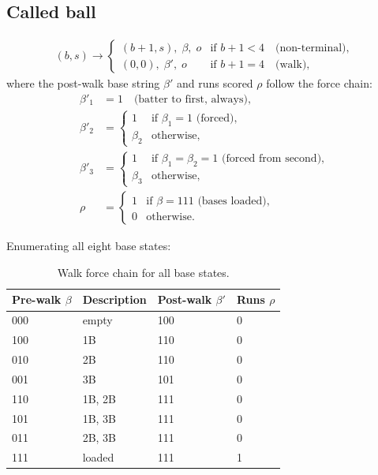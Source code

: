 \subsection{Called ball}
\begin{align}
(b, s) \to
\begin{cases}
(b+1, s), \; \beta, \; o & \text{if } b + 1 < 4 \quad \text{(non-terminal)},\\
(0,0), \; \beta', \; o & \text{if } b + 1 = 4 \quad \text{(walk)},
\end{cases}
\end{align}
where the post-walk base string $\beta'$ and runs scored $\rho$ follow the
force chain:
\begin{align}
\beta'_1 &= 1 \quad \text{(batter to first, always)},\\
\beta'_2 &= \begin{cases} 1 & \text{if } \beta_1 = 1 \text{ (forced)},\\
                          \beta_2 & \text{otherwise},\end{cases}\\
\beta'_3 &= \begin{cases} 1 & \text{if } \beta_1 = \beta_2 = 1
                              \text{ (forced from second)},\\
                          \beta_3 & \text{otherwise},\end{cases}\\
\rho &= \begin{cases} 1 & \text{if } \beta = 111 \text{ (bases loaded)},\\
                      0 & \text{otherwise}.\end{cases}
\end{align}

Enumerating all eight base states:

\begin{table}[h]
\centering
\caption{Walk force chain for all base states.}
\label{tab:forcechain}
\begin{tabular}{llll}
\toprule
Pre-walk $\beta$ & Description & Post-walk $\beta'$ & Runs $\rho$ \\
\midrule
000 & empty          & 100 & 0 \\
100 & 1B             & 110 & 0 \\
010 & 2B             & 110 & 0 \\
001 & 3B             & 101 & 0 \\
110 & 1B, 2B         & 111 & 0 \\
101 & 1B, 3B         & 111 & 0 \\
011 & 2B, 3B         & 111 & 0 \\
111 & loaded         & 111 & 1 \\
\bottomrule
\end{tabular}
\end{table}

